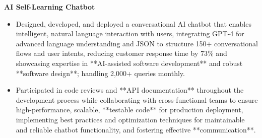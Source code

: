 \documentclass[a4paper,10pt]{article}
\begin{document}
\vspace{-2mm}
\textbf{AI Self-Learning Chatbot} \\
\begin{itemize}[leftmargin=*, itemsep=0pt, parsep=1pt]
\vspace{-7mm}
    \item Designed, developed, and deployed a conversational AI chatbot that enables intelligent, natural language interaction with users, integrating GPT-4 for advanced language understanding and JSON to structure 150+ conversational flows and user intents, reducing customer response time by 73\% and showcasing expertise in **AI-assisted software development** and robust **software design**; handling 2,000+ queries monthly.
    \item Participated in code reviews and **API documentation** throughout the development process while collaborating with cross-functional teams to ensure high-performance, scalable, **testable code** for production deployment, implementing best practices and optimization techniques for maintainable and reliable chatbot functionality, and fostering effective **communication**.
\end{itemize}

\vspace{-2mm}
\end{document}
